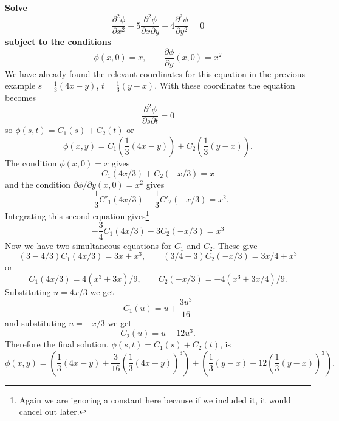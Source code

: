 \begin{exm}
{\bf Solve}
\[\frac{\partial^2\phi}{\partial x^2}+5\frac{\partial^2\phi}{\partial x\partial y}+4\frac{\partial^2\phi}{\partial y^2}=0\]
{\bf subject to the conditions}
\[\phi(x,0)=x,\qquad\frac{\partial\phi}{\partial y}(x,0)=x^2\]
We have already found the relevant coordinates for this equation in the previous example $s=\tfrac{1}{3}(4x-y)$, $t=\tfrac{1}{3}(y-x)$. With these coordinates the equation becomes
\[\frac{\partial^2\phi}{\partial s\partial t}=0\]
so $\phi(s,t)=C_1(s)+C_2(t)$ or
\[\phi(x,y)=C_1\left(\frac{1}{3}(4x-y)\right)+C_2\left(\frac{1}{3}(y-x)\right).\]
The condition $\phi(x,0)=x$ gives
\[C_1(4x/3)+C_2(-x/3)=x\]
and the condition $\partial\phi/\partial y(x,0)=x^2$ gives
\[-\frac{1}{3}C'_1(4x/3)+\frac{1}{3}C'_2(-x/3)=x^2.\]
Integrating this second equation gives\footnote{Again we are ignoring a constant here because if we included it, it would cancel out later.}
\[-\frac{3}{4}C_1(4x/3)-3C_2(-x/3)=x^3\]
Now we have two simultaneous equations for $C_1$ and $C_2$. These give
\[(3-4/3)C_1(4x/3)=3x+x^3,\qquad (3/4-3)C_2(-x/3)=3x/4+x^3\]
or
\[C_1(4x/3)=4(x^3+3x)/9,\qquad C_2(-x/3)=-4(x^3+3x/4)/9.\]
Substituting $u=4x/3$ we get
\[C_1(u)=u+\frac{3u^3}{16}\]
and substituting $u=-x/3$ we get
\[C_2(u)=u+12u^3.\]
Therefore the final solution, $\phi(s,t)=C_1(s)+C_2(t)$, is
\[\phi(x,y)=\left(\frac{1}{3}(4x-y)+\frac{3}{16}\left(\frac{1}{3}(4x-y)\right)^3\right)+\left(\frac{1}{3}(y-x)+12\left(\frac{1}{3}(y-x)\right)^3\right).\]
\end{exm}

